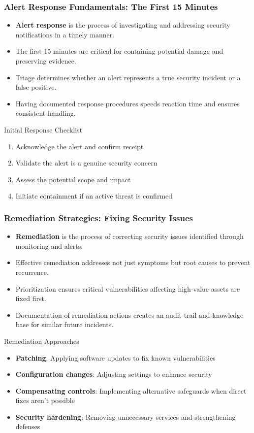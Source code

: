 \documentclass{beamer}
\begin{document}
\begin{frame}
\frametitle{Alert Response Fundamentals: The First 15 Minutes}
\begin{itemize}
\item \textbf{Alert response} is the process of investigating and addressing security notifications in a timely manner.
\item The first 15 minutes are critical for containing potential damage and preserving evidence.
\item Triage determines whether an alert represents a true security incident or a false positive.
\item Having documented response procedures speeds reaction time and ensures consistent handling.
\end{itemize}

\begin{alertblock}{Initial Response Checklist}
\scriptsize
\begin{enumerate}
\item Acknowledge the alert and confirm receipt
\item Validate the alert is a genuine security concern
\item Assess the potential scope and impact
\item Initiate containment if an active threat is confirmed
\end{enumerate}
\end{alertblock}
\end{frame}


\begin{frame}
\frametitle{Remediation Strategies: Fixing Security Issues}
\begin{itemize}
\item \textbf{Remediation} is the process of correcting security issues identified through monitoring and alerts.
\item Effective remediation addresses not just symptoms but root causes to prevent recurrence.
\item Prioritization ensures critical vulnerabilities affecting high-value assets are fixed first.
\item Documentation of remediation actions creates an audit trail and knowledge base for similar future incidents.
\end{itemize}

\begin{block}{Remediation Approaches}
\begin{itemize}
\item \textbf{Patching}: Applying software updates to fix known vulnerabilities
\item \textbf{Configuration changes}: Adjusting settings to enhance security
\item \textbf{Compensating controls}: Implementing alternative safeguards when direct fixes aren't possible
\item \textbf{Security hardening}: Removing unnecessary services and strengthening defenses
\end{itemize}
\end{block}
\end{frame}
\end{document}
